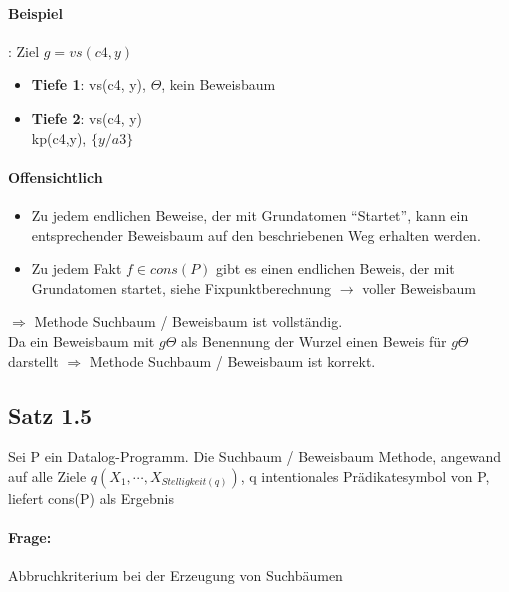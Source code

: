 \documentclass[12pt, a4paper]{article}
\begin{document}
\paragraph{Beispiel}: Ziel $g = vs(c4, y)$ \\

\begin{itemize}
\item \textbf{Tiefe 1}: vs(c4, y), $\Theta$, kein Beweisbaum
\item \textbf{Tiefe 2}: vs(c4, y)  \\
kp(c4,y), $\{ y / a3 \}$
\end{itemize}


\paragraph{Offensichtlich}
\begin{itemize}
\item Zu jedem endlichen Beweise, der mit Grundatomen ``Startet'', kann ein entsprechender Beweisbaum auf den beschriebenen Weg erhalten werden.
\item Zu jedem Fakt  $f \in cons(P)$ gibt es einen endlichen Beweis, der mit Grundatomen startet, siehe Fixpunktberechnung $\rightarrow$ voller Beweisbaum
\end{itemize}

$\Rightarrow$ Methode Suchbaum / Beweisbaum ist vollständig. \\
Da ein Beweisbaum mit $g\Theta$ als Benennung der Wurzel einen Beweis für $g\Theta$ darstellt $\Rightarrow$ Methode Suchbaum / Beweisbaum ist korrekt.


\subsection*{Satz 1.5} Sei P ein Datalog-Programm. Die Suchbaum  / Beweisbaum Methode, angewand auf alle Ziele $q(X_1, \cdots, X_{Stelligkeit(q)})$, q intentionales Prädikatesymbol von P, liefert cons(P) als Ergebnis

\paragraph{Frage:} Abbruchkriterium bei der Erzeugung von Suchbäumen
\end{document}
